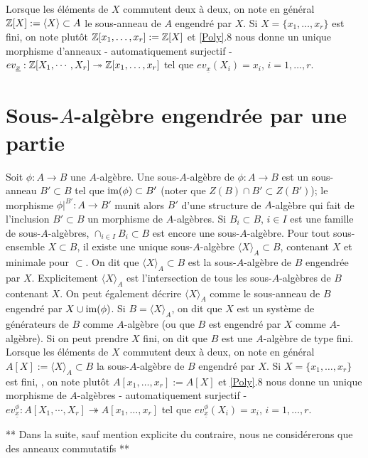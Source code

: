  Lorsque les éléments de $X$ commutent deux à deux, on note en général $\mathbb{Z}[X]:=\langle X\rangle \subset A$ le sous-anneau de $A$ engendré par $X$. Si  $X=\lbrace x_1,\dots,x_r\rbrace $ est fini, on note plutôt $\mathbb{Z}[x_1,\dots,x_r]:=\mathbb{Z}[X]$ et \ref{Poly}.8  nous donne un unique morphisme d'anneaux - automatiquement  surjectif - $ev_{\underline{x}}:\mathbb{Z}[X_1,\cdots, X_r]\twoheadrightarrow \mathbb{Z}[x_1,\dots,x_r] $ tel que $ev_{\underline{x}}(X_i)=x_i$, $i=1,\dots, r$.   \\
 
  \section{Sous-$A$-algèbre engendrée par une partie}\label{SousAlg} Soit $\phi:A\rightarrow B$ une $A$-algèbre. Une sous-$A$-algèbre de $\phi:A\rightarrow B$ est un sous-anneau $B'\subset B$ tel que $\hbox{\rm im}(\phi)\subset B'$ (noter que $Z(B)\cap B'\subset Z(B')$); le morphisme $\phi|^{B'}:A\rightarrow B'$ munit alors $B'$ d'une structure de $A$-algèbre qui fait de l'inclusion $B'\subset B$ un morphisme de $A$-algèbres. Si    $B_i\subset B$, $i\in I$ est une famille de sous-$A$-algèbres, $\cap_{i\in I}B_i\subset B$  est encore une sous-$A$-algèbre. Pour tout sous-ensemble $X\subset B$, il existe 
une unique sous-$A$-algèbre $\langle X\rangle_A \subset B$, contenant $X$ et minimale pour $\subset$. On dit que $\langle X\rangle_A\subset B$ est la sous-$A$-algèbre de $B$ engendrée par $X$. Explicitement $\langle X\rangle_A$ est l'intersection de tous les sous-$A$-algèbres de $B$ contenant $X$. On peut également décrire $\langle X\rangle_A$ comme  le sous-anneau de $B$ engendré par $X\cup\hbox{\rm im}(\phi)$. Si $B=\langle X\rangle_A$, on dit que $X$ est un système de générateurs de $B$ comme $A$-algèbre (ou que $B$ est engendré par $X$ comme $A$-algèbre). Si on peut prendre $X$ fini, on dit que $B$ est une $A$-algèbre de type fini.\\

 Lorsque les éléments de $X$ commutent deux à deux, on note en général $A[X]:=\langle X\rangle_A \subset B$ la sous-$A$-algèbre de $B$ engendré par $X$. Si  $X=\lbrace x_1,\dots,x_r\rbrace $ est fini, , on note plutôt $A[x_1,\dots,x_r]:=A[X]$ et  \ref{Poly}.8  nous donne un unique morphisme de $A$-algèbres - automatiquement  surjectif - $ev_{\underline{x}}^\phi:A[X_1,\cdots, X_r]\twoheadrightarrow A[x_1,\dots, x_r] $ tel que $ev^\phi_{\underline{x}}(X_i)=x_i$, $i=1,\dots, r$. \\

 
 
 \begin{center} **  Dans la suite,  sauf mention explicite du contraire, nous ne considérerons que des anneaux commutatifs **\\\end{center}
